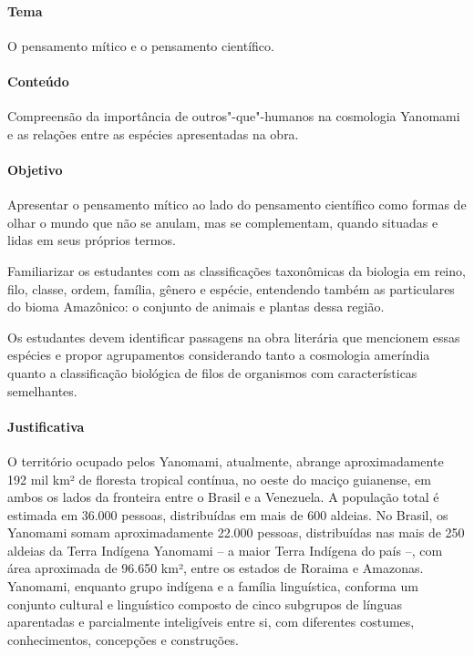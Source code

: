 \documentclass[12pt]{extarticle}
\begin{document}
\paragraph{Tema} O pensamento mítico e o pensamento científico.

\paragraph{Conteúdo} Compreensão da importância de outros"-que"-humanos na cosmologia
Yanomami e as relações entre as espécies apresentadas na obra. 

\paragraph{Objetivo} Apresentar o pensamento mítico ao lado do pensamento científico
como formas de olhar o mundo que não se anulam, mas se complementam, quando situadas e 
lidas em seus próprios termos. 

Familiarizar os estudantes com as classificações taxonômicas da biologia em reino, filo, 
classe, ordem, família, gênero e espécie, entendendo também as particulares do bioma 
Amazônico: o conjunto de animais e plantas dessa região.

Os estudantes devem identificar passagens na obra literária que mencionem essas espécies e
propor agrupamentos considerando tanto a cosmologia ameríndia quanto a classificação biológica
de filos de organismos com características semelhantes. 

\paragraph{Justificativa} O território ocupado pelos Yanomami, atualmente, abrange 
aproximadamente 192 mil km² de floresta tropical contínua, no oeste do maciço 
guianense, em ambos os lados da fronteira entre o Brasil e a Venezuela. A população 
total é estimada em 36.000 pessoas, distribuídas em  mais de 600 aldeias. 
No Brasil, os Yanomami somam aproximadamente 22.000 pessoas, distribuídas 
nas mais de 250 aldeias da Terra Indígena Yanomami – a maior Terra Indígena 
do país –, com área aproximada de 96.650 km², entre os estados de Roraima e 
Amazonas. Yanomami, enquanto grupo indígena e a família linguística, conforma
um conjunto cultural e linguístico composto de cinco subgrupos de línguas 
aparentadas e parcialmente inteligíveis entre si, com diferentes costumes, 
conhecimentos, concepções e construções.
\end{document}
